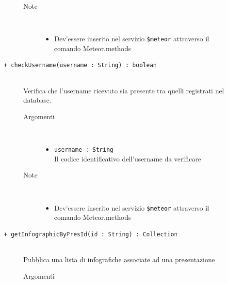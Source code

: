 \begin{description}
\begin{description}
\begin{description}
\begin{itemize}
				\end{itemize}
			\item[Note] \hfill \\
			\begin{itemize}
					\item Dev'essere inserito nel servizio \texttt{\$meteor} attraverso il comando Meteor.methods
				\end{itemize}
		\end{description}
	\end{description}
	
	\begin{description}
		\item[\texttt{+ checkUsername(username : String) : boolean			}] \hfill \\
			Verifica che l'username ricevuto sia presente tra quelli registrati nel database.
			
		\begin{description}
			\item[Argomenti] \hfill \\
				\begin{itemize}
				
					\item \texttt{username : String			} \hfill \\
					Il codice identificativo dell'username da verificare
					
				\end{itemize}
			\item[Note] \hfill \\
			\begin{itemize}
					\item Dev'essere inserito nel servizio \texttt{\$meteor} attraverso il comando Meteor.methods
				\end{itemize}
		\end{description}
	\end{description}
	
	\begin{description}
		\item[\texttt{+ getInfographicByPresId(id : String) : Collection			}] \hfill \\
			Pubblica una lista di infografiche associate ad una presentazione
			
		\begin{description}
			\item[Argomenti] \hfill \\
				\begin{itemize}
				

\end{itemize}
\end{description}
\end{description}
\end{description}
